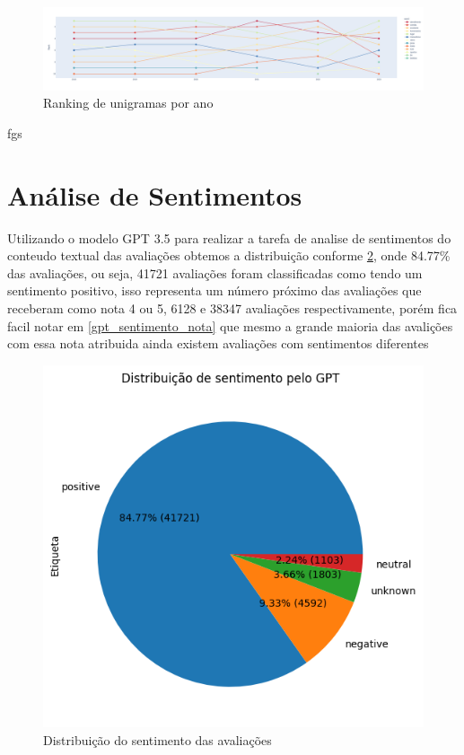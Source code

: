 \begin{figure}
	\centering
	\includegraphics[width=.7\textwidth]{figs/exploratoria/ranking_unigramas_por_ano.png}
	\caption{Ranking de unigramas por ano}
	\label{img:rank_unigramas}
\end{figure} fgs

\section{Análise de Sentimentos}
\label{cap:resultados:sec:analise_sentimento}

Utilizando o modelo GPT 3.5 para realizar a tarefa de analise de sentimentos do conteudo textual das avaliações obtemos a distribuição conforme \ref{img:gpt_pizza_distribuicao}, onde 84.77\% das avaliações, ou seja, 41721 avaliações foram classificadas como tendo um sentimento positivo, isso representa um número próximo das avaliações que receberam como nota 4 ou 5, 6128 e 38347 avaliações respectivamente, porém fica facil notar em \ref{gpt_sentimento_nota} que mesmo a grande maioria das avalições com essa nota atribuida ainda existem avaliações com sentimentos diferentes

\begin{figure}
	\centering
	\includegraphics[width=1\textwidth]{figs/gpt/distribuicao_pizza.png}
	\caption{Distribuição do sentimento das avaliações}
	\label{img:gpt_pizza_distribuicao}
\end{figure}

